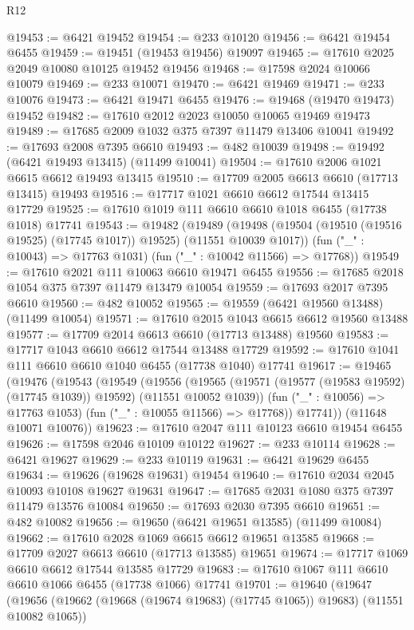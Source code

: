 \begin{lexlean}{R12}
\begin{coremodule}
@19453 := @6421 @19452
@19454 := @233 @10120
@19456 := @6421 @19454 @6455
@19459 := @19451 (@19453 @19456) @19097
@19465 := @17610 @2025 @2049 @10080 @10125 @19452 @19456
@19468 := @17598 @2024 @10066 @10079
@19469 := @233 @10071
@19470 := @6421 @19469
@19471 := @233 @10076
@19473 := @6421 @19471 @6455
@19476 := @19468 (@19470 @19473) @19452
@19482 := @17610 @2012 @2023 @10050 @10065 @19469 @19473
@19489 := @17685 @2009 @1032 @375 @7397 @11479 @13406 @10041
@19492 := @17693 @2008 @7395 @6610
@19493 := @482 @10039
@19498 := @19492 (@6421 @19493 @13415) (@11499 @10041)
@19504 := @17610 @2006 @1021 @6615 @6612 @19493 @13415
@19510 := @17709 @2005 @6613 @6610 (@17713 @13415) @19493
@19516 := @17717 @1021 @6610 @6612 @17544 @13415 @17729
@19525 := @17610 @1019 @111 @6610 @6610 @1018 @6455 (@17738 @1018) @17741
@19543 := @19482
    (@19489
      (@19498 (@19504 (@19510 (@19516 @19525) (@17745 @1017)) @19525) (@11551 @10039 @1017))
      (fun ("_" : @10043) => @17763 @1031)
      (fun ("_" : @10042 @11566) => @17768))
@19549 := @17610 @2021 @111 @10063 @6610 @19471 @6455
@19556 := @17685 @2018 @1054 @375 @7397 @11479 @13479 @10054
@19559 := @17693 @2017 @7395 @6610
@19560 := @482 @10052
@19565 := @19559 (@6421 @19560 @13488) (@11499 @10054)
@19571 := @17610 @2015 @1043 @6615 @6612 @19560 @13488
@19577 := @17709 @2014 @6613 @6610 (@17713 @13488) @19560
@19583 := @17717 @1043 @6610 @6612 @17544 @13488 @17729
@19592 := @17610 @1041 @111 @6610 @6610 @1040 @6455 (@17738 @1040) @17741
@19617 := @19465
    (@19476
      (@19543
        (@19549
          (@19556
            (@19565 (@19571 (@19577 (@19583 @19592) (@17745 @1039)) @19592) (@11551 @10052 @1039))
            (fun ("_" : @10056) => @17763 @1053)
            (fun ("_" : @10055 @11566) => @17768))
          @17741))
      (@11648 @10071 @10076))
@19623 := @17610 @2047 @111 @10123 @6610 @19454 @6455
@19626 := @17598 @2046 @10109 @10122
@19627 := @233 @10114
@19628 := @6421 @19627
@19629 := @233 @10119
@19631 := @6421 @19629 @6455
@19634 := @19626 (@19628 @19631) @19454
@19640 := @17610 @2034 @2045 @10093 @10108 @19627 @19631
@19647 := @17685 @2031 @1080 @375 @7397 @11479 @13576 @10084
@19650 := @17693 @2030 @7395 @6610
@19651 := @482 @10082
@19656 := @19650 (@6421 @19651 @13585) (@11499 @10084)
@19662 := @17610 @2028 @1069 @6615 @6612 @19651 @13585
@19668 := @17709 @2027 @6613 @6610 (@17713 @13585) @19651
@19674 := @17717 @1069 @6610 @6612 @17544 @13585 @17729
@19683 := @17610 @1067 @111 @6610 @6610 @1066 @6455 (@17738 @1066) @17741
@19701 := @19640
    (@19647
      (@19656 (@19662 (@19668 (@19674 @19683) (@17745 @1065)) @19683) (@11551 @10082 @1065))

\end{coremodule}
\end{lexlean}
